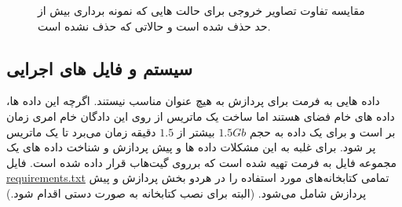 \begin{figure}[t!]
	\centering
	\hfill
	\caption{مقایسه تفاوت تصاویر خروجی برای حالت هایی که نمونه برداری بیش از حد حذف شده است و حالاتی که حذف نشده است. }
	\label{fig:413469fd-9354-400c-88e3-b29e7c711a05}
\end{figure}




\subsection{سیستم و فایل های اجرایی}
داده هایی به فرمت 
برای پردازش به هیچ عنوان مناسب نیستند. اگرچه این داده ها، داده های خام فضای \kspace
هستند اما ساخت یک ماتریس \kspace از روی این دادگان خام امری زمان بر است و برای یک داده به حجم $1.5 Gb$ 
بیشتر از $1.5$ دقیقه زمان می‌برد تا یک ماتریس \kspace پر شود. برای غلبه به این مشکلات داده ها و پیش پردازش و شناخت داده های \kspace یک مجموعه فایل به فرمت 
تهیه شده است که برروی گیت‌هاب 
قرار داده شده است. فایل 
\href{https://github.com/MohammadRaziei/mri-reconstruction/blob/master/python/requirements.txt}{requirements.txt}
تمامی کتابخانه‌های مورد استفاده را در هردو بخش پردازش و پیش پردازش شامل می‌شود. (البته برای نصب کتابخانه  به صورت دستی اقدام شود.)

